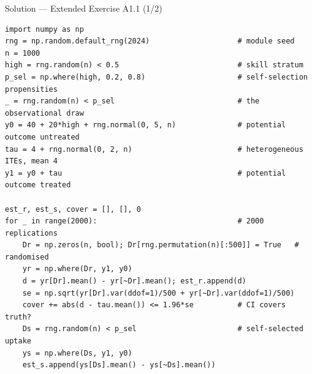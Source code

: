 \documentclass[aspectratio=169,11pt]{beamer}
\begin{document}
\begin{frame}[fragile]{Solution --- Extended Exercise A1.1 (1/2)}
\begin{solutionbox}
\begin{lstlisting}[basicstyle=\ttfamily\scriptsize]
import numpy as np
rng = np.random.default_rng(2024)                    # module seed
n = 1000
high = rng.random(n) < 0.5                           # skill stratum
p_sel = np.where(high, 0.2, 0.8)                     # self-selection propensities
_ = rng.random(n) < p_sel                            # the observational draw
y0 = 40 + 20*high + rng.normal(0, 5, n)              # potential outcome untreated
tau = 4 + rng.normal(0, 2, n)                        # heterogeneous ITEs, mean 4
y1 = y0 + tau                                        # potential outcome treated

est_r, est_s, cover = [], [], 0
for _ in range(2000):                                # 2000 replications
    Dr = np.zeros(n, bool); Dr[rng.permutation(n)[:500]] = True   # randomised
    yr = np.where(Dr, y1, y0)
    d = yr[Dr].mean() - yr[~Dr].mean(); est_r.append(d)
    se = np.sqrt(yr[Dr].var(ddof=1)/500 + yr[~Dr].var(ddof=1)/500)
    cover += abs(d - tau.mean()) <= 1.96*se          # CI covers truth?
    Ds = rng.random(n) < p_sel                       # self-selected uptake
    ys = np.where(Ds, y1, y0)
    est_s.append(ys[Ds].mean() - ys[~Ds].mean())
\end{lstlisting}
\end{solutionbox}
\end{frame}
\end{document}
